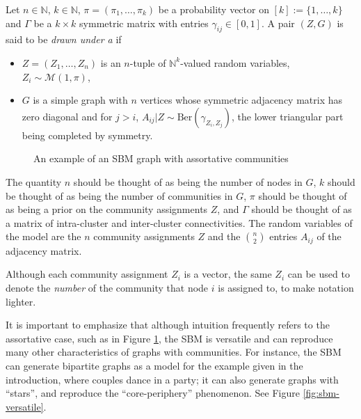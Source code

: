 \documentclass[../../main.tex]{subfiles} %
\begin{document}
\begin{definition} \label{def:sbm}
	Let \(n \in \mathbb N\), \(k \in \mathbb N\), \(\pi = (\pi_1, \dots, 
	\pi_k)\) be a probability vector on \([k] := \{1, \dots, k\}\) and  
	\(\Gamma\) be a \(k \times k\) symmetric matrix with entries \(\gamma_{ij} 
	\in [0, 1]\). A pair \((Z, G)\) is said to be \textit{drawn under a 
		} if 
	\begin{itemize}
		\item \(Z = (Z_1, \dots, Z_n)\) is an \(n\)-tuple of \(\mathbb 
		N^k\)-valued random variables, \(Z_i \sim \mathcal M (1, \pi)\),
		\item \(G\) is a simple graph with \(n\) vertices whose symmetric 
		adjacency matrix has zero diagonal and for \(j > i\), \(A_{ij} \vert Z \sim 
		\text{Ber}(\gamma_{Z_i, Z_j})\), the lower triangular part being 
		completed by symmetry.
	\end{itemize}
\end{definition}

\begin{figure}[ht]
	\centering
	\caption{An example of an SBM graph with assortative communities}
	\label{fig:sbm-example}
\end{figure}

\begin{remark}
	The quantity \(n\) should be thought of as being the number of nodes in 
	\(G\), \(k\) should be thought of as being the number of communities in 
	\(G\), \(\pi\) should be thought of as being a prior on the community 
	assignments \(Z\), and \(\Gamma\) should be thought of as a matrix of 
	intra-cluster and inter-cluster connectivities. The random variables of the 
	model are the \(n\) community assignments \(Z\) and the \(\binom{n}{2}\) 
	entries \(A_{ij}\) of the adjacency matrix.
\end{remark}

\begin{remark}
	Although each community assignment \(Z_i\) is a vector, the same \(Z_i\) 
	can be used to denote the \textit{number} of the community that node \(i\) 
	is assigned to, to make notation lighter.
\end{remark}

It is important to emphasize that although intuition frequently refers to the 
assortative case, such as in Figure \ref{fig:sbm-example}, the SBM is versatile 
and can reproduce many other characteristics of graphs with communities. For 
instance, the SBM can generate bipartite graphs as a model for the example 
given in the introduction, where couples dance in a party; it can also generate 
graphs with ``stars'', and reproduce the ``core-periphery'' phenomenon. See 
Figure \ref{fig:sbm-versatile}.
\end{document}
